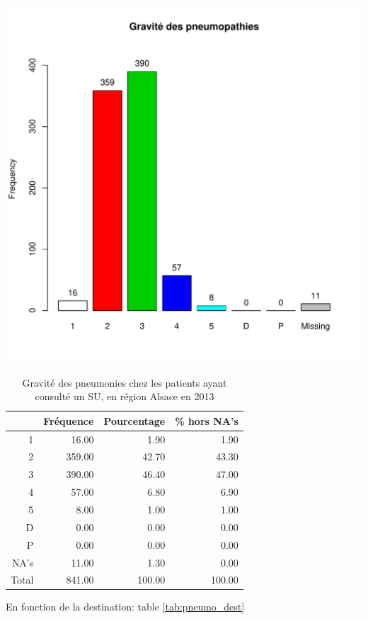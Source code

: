 \documentclass[12pt,english,french,twoside]{book}\usepackage[]{graphicx}\usepackage[]{color}
\makeatletter
\def\maxwidth{ %
  \ifdim\Gin@nat@width>\linewidth
    \linewidth
  \else
    \Gin@nat@width
  \fi
}
\makeatother
\begin{document}
\includegraphics[width=\maxwidth]{figure/unnamed-chunk-39-1} 
\begin{table}[ht]
\centering
\begin{tabular}{rrrr}
  \hline
 & Fréquence & Pourcentage & \% hors NA's \\ 
  \hline
1 & 16.00 & 1.90 & 1.90 \\ 
  2 & 359.00 & 42.70 & 43.30 \\ 
  3 & 390.00 & 46.40 & 47.00 \\ 
  4 & 57.00 & 6.80 & 6.90 \\ 
  5 & 8.00 & 1.00 & 1.00 \\ 
  D & 0.00 & 0.00 & 0.00 \\ 
  P & 0.00 & 0.00 & 0.00 \\ 
  NA's & 11.00 & 1.30 & 0.00 \\ 
    Total & 841.00 & 100.00 & 100.00 \\ 
   \hline
\end{tabular}
\caption[Gravité des pneumonies]{Gravité des pneumonies chez les patients ayant consulté un  SU, en région Alsace en 2013} 
\label{tab:pneumonies}
\end{table}


En fonction de la destination: table \ref{tab:pneumo_dest}
\end{document}
